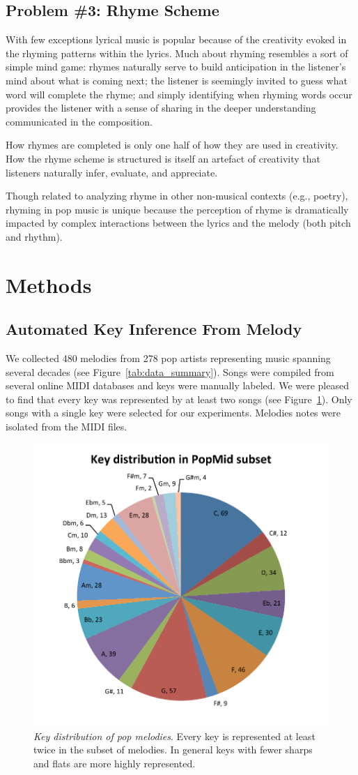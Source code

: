 \documentclass[letterpaper]{article}
\begin{document}
\subsection{Problem \#3: Rhyme Scheme}

With few exceptions lyrical music is popular because of the creativity evoked in the rhyming patterns within the lyrics. Much about rhyming resembles a sort of simple mind game: rhymes naturally serve to build anticipation in the listener's mind about what is coming next; the listener is seemingly invited to guess what word will complete the rhyme; and simply identifying when rhyming words occur provides the listener with a sense of sharing in the deeper understanding communicated in the composition. 

How rhymes are completed is only one half of how they are used in creativity. How the rhyme scheme is structured is itself an artefact of creativity that listeners naturally infer, evaluate, and appreciate.

Though related to analyzing rhyme in other non-musical contexts (e.g., poetry), rhyming in pop music is unique because the perception of rhyme is dramatically impacted by complex interactions between the lyrics and the melody (both pitch and rhythm).

\section{Methods}
\subsection{Automated Key Inference From Melody}


We collected 480 melodies from 278 pop artists representing music spanning several decades (see Figure~\ref{tab:data_summary}). Songs were compiled from several online MIDI databases and keys were manually labeled. We were pleased to find that every key was represented by at least two songs (see Figure~\ref{fig:key_distribution}). Only songs with a single key were selected for our experiments. Melodies notes were isolated from the MIDI files. 


\begin{figure}
  \centering
 \includegraphics[width=.4\textwidth]{./key_distribution.pdf}
  \caption{\emph{Key distribution of pop melodies}. Every key is represented at least twice in the subset of melodies. In general keys with fewer sharps and flats are more highly represented.}
  \label{fig:key_distribution}
\end{figure}
\end{document}
